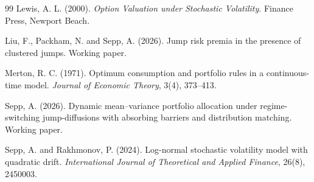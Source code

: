 \documentclass[11pt]{article}
\theoremstyle{remark}
\begin{document}
\begin{thebibliography}{99}
 Lewis, A. L. (2000). \textit{Option Valuation under Stochastic Volatility}. Finance Press, Newport Beach.

 Liu, F., Packham, N. and Sepp, A. (2026). Jump risk premia in the presence of clustered jumps. Working paper.

 Merton, R. C. (1971). Optimum consumption and portfolio rules in a continuous-time model. \textit{Journal of Economic Theory}, 3(4), 373--413.

 Sepp, A. (2026). Dynamic mean--variance portfolio allocation under regime-switching jump-diffusions with absorbing barriers and distribution matching. Working paper.

 Sepp, A. and Rakhmonov, P. (2024). Log-normal stochastic volatility model with quadratic drift. \textit{International Journal of Theoretical and Applied Finance}, 26(8), 2450003.

\end{thebibliography}
\end{document}
